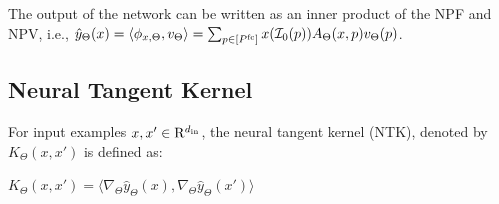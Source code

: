 \begin{proposition}\label{prop:zero}  The output of the network can be written as an inner product of the NPF and NPV, i.e., 
$\hat{y}_{\Theta}(x)=\langle \phi_{x,\Theta},v_{\Theta}\rangle=\sum_{p\in [P^{\text{fc}}]}x(\mathcal{I}_0(p))A_{\Theta}(x,p)v_{\Theta}(p)$.
\end{proposition}

\subsection{Neural Tangent Kernel}
\begin{definition} For input examples $x,x'\in\mathrm{R}^{d_{\text{in}}}$, the neural tangent kernel (NTK), denoted by $K_{\Theta}(x,x')$ is defined as:
\centerline{$
K_{\Theta}(x,x') = \langle\nabla_{\Theta} \hat{y}_{\Theta}(x), \nabla_{\Theta} \hat{y}_{\Theta}(x') \rangle
$}
\end{definition}

